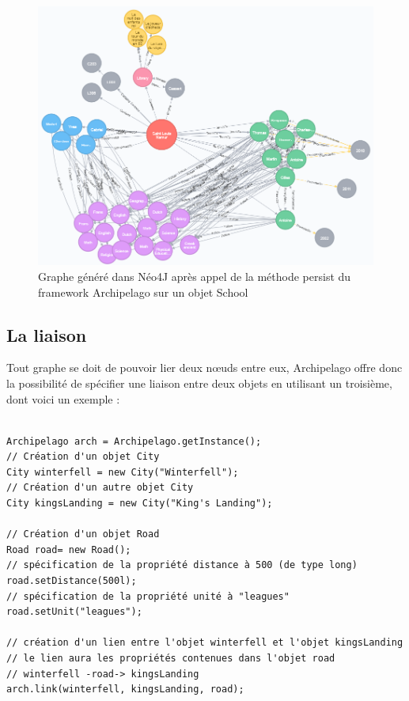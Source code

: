 \documentclass[a4paper,fleqn,12pt,oneside]{report}
\begin{document}
\begin{figure}[!ht]
\centering
\includegraphics[scale=0.9]{figures/ecoleNeo4J.png}
\caption{Graphe généré dans Néo4J après appel de la méthode persist du framework Archipelago sur un objet School}
\label{fig:ecoleNeo4J}
\end{figure}

\newpage
\subsection{La liaison}

Tout graphe se doit de pouvoir lier deux nœuds entre eux, Archipelago offre donc la possibilité de spécifier une liaison entre deux objets en utilisant un troisième, dont voici un exemple : 

\begin{lstlisting}

Archipelago arch = Archipelago.getInstance();
// Création d'un objet City
City winterfell = new City("Winterfell");
// Création d'un autre objet City
City kingsLanding = new City("King's Landing");

// Création d'un objet Road
Road road= new Road();
// spécification de la propriété distance à 500 (de type long)
road.setDistance(500l);
// spécification de la propriété unité à "leagues"
road.setUnit("leagues");
        
// création d'un lien entre l'objet winterfell et l'objet kingsLanding
// le lien aura les propriétés contenues dans l'objet road
// winterfell -road-> kingsLanding
arch.link(winterfell, kingsLanding, road);

\end{lstlisting}
\end{document}
